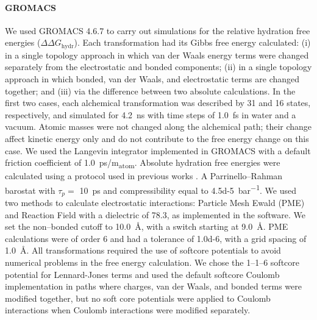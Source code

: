 \documentclass[journal=jctcce,manuscript=article]{achemso}
\begin{document}
\paragraph{GROMACS} We used GROMACS 4.6.7 to carry out simulations for 
the relative hydration free energies ($\Delta \Delta G_{\mathrm{hydr}}$).
Each transformation had its Gibbs free energy calculated: (i) in a single 
topology approach in which van der Waals energy terms were changed separately 
from the electrostatic and bonded components; (ii) in a single topology 
approach in which bonded, van der Waals, and electrostatic terms are changed 
together;  and (iii) via the difference between two absolute calculations.
In the first two cases, each alchemical transformation was described by 31 and 
16 states, respectively, and simulated for \SI{4.2}{ns} with time steps of 
\SI{1.0}{fs} in water and a vacuum. Atomic masses were not changed along the 
alchemical path;
their change affect kinetic energy only and do not contribute to the free 
energy change on this case. 
We used the Langevin integrator implemented in GROMACS with a 
default friction coefficient of \SI{1.0}{ps/m_{atom}}. 
Absolute hydration free energies were calculated using a protocol used in 
previous works \cite{Mobley2014, doi:10.1021/acs.jced.7b00104}.
A Parrinello--Rahman barostat with $\tau_p =$ \SI{10}{ps} and compressibility 
equal to \SI{4.5d-5}{bar^{-1}}.
We used two methods to calculate electrostatic interactions: Particle Mesh 
Ewald (PME) and Reaction Field with a dielectric of 78.3, as implemented in the 
software. 
We set the non--bonded cutoff to \SI{10.0}{\angstrom}, with a switch 
starting at \SI{9.0}{\angstrom}.  
PME calculations were of order 6 and had a 
tolerance of \num{1.0d-6}, with a grid spacing of \SI{1.0}{\angstrom}. 
All transformations required the use of softcore potentials to avoid numerical 
problems in the free energy calculation.  We chose the 1--1--6 softcore 
potential for Lennard-Jones terms and used the default softcore Coulomb 
implementation in paths where charges, van der Waals, and bonded terms were 
modified together, but no soft core potentials were applied to Coulomb 
interactions when Coulomb interactions were modified separately.
\end{document}
